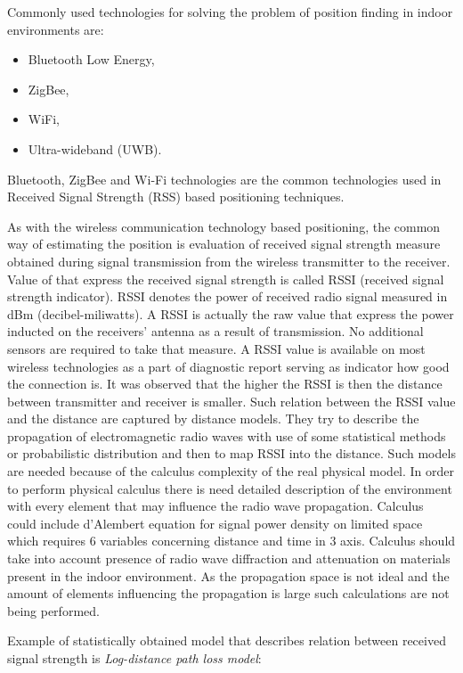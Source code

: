\documentclass[../main.tex]{subfiles}
\begin{document}
Commonly used technologies for solving the problem of position finding in indoor environments are\cite{positioning_tests}:
\begin{itemize}
	\item Bluetooth Low Energy,
	\item ZigBee,
	\item WiFi,
	\item Ultra-wideband (UWB).
\end{itemize}

Bluetooth, ZigBee and Wi-Fi technologies are the common technologies used in Received Signal Strength (RSS) based positioning techniques.

As with the wireless communication technology based positioning, the common way of estimating the position is evaluation of received signal strength measure obtained during signal transmission from the wireless transmitter to the receiver. Value of that express the received signal strength is called RSSI (received signal strength indicator). RSSI denotes the power of received radio signal measured in dBm (decibel-miliwatts). A RSSI is actually the raw value that express the power inducted on the receivers' antenna as a result of transmission. No additional sensors are required to take that measure. A RSSI value is available on most wireless technologies as a part of diagnostic report serving as indicator how good the connection is. It was observed that the higher the RSSI is then the distance between transmitter and receiver is smaller. Such relation between the RSSI value and the distance are captured by distance models.  They try to describe the propagation of electromagnetic radio waves with use of some statistical methods or probabilistic distribution and then to map RSSI into the distance\cite{RSSI_path_loss_prediction_model}. Such models are needed because of the calculus complexity of the real physical model. In order to perform physical calculus there is need detailed description of the environment with every element that may influence the radio wave propagation. Calculus could include d'Alembert equation for signal power density on limited space which requires 6 variables concerning distance and time in 3 axis. Calculus should take into account presence of radio wave diffraction and attenuation on materials present in the indoor environment. As the propagation space is not ideal and the amount of elements influencing the propagation is large such calculations are not being performed.

Example of statistically obtained model that describes relation between received signal strength is \textit{Log-distance path loss model}\cite{RSSI_path_loss_prediction_model}:
\end{document}

